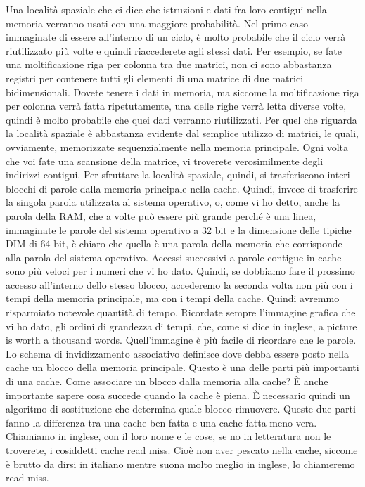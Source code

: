 Una località spaziale che ci dice che istruzioni e dati fra loro contigui nella memoria verranno usati con una maggiore probabilità.
Nel primo caso immaginate di essere all'interno di un ciclo, è molto probabile che il ciclo verrà riutilizzato più volte e quindi riaccederete agli stessi dati.
Per esempio, se fate una moltificazione riga per colonna tra due matrici, non ci sono abbastanza registri per contenere tutti gli elementi di una matrice di due matrici bidimensionali.
Dovete tenere i dati in memoria, ma siccome la moltificazione riga per colonna verrà fatta ripetutamente, una delle righe verrà letta diverse volte, quindi è molto probabile che quei dati verranno riutilizzati.
Per quel che riguarda la località spaziale è abbastanza evidente dal semplice utilizzo di matrici, le quali, ovviamente, memorizzate sequenzialmente nella memoria principale.
Ogni volta che voi fate una scansione della matrice, vi troverete verosimilmente degli indirizzi contigui.
Per sfruttare la località spaziale, quindi, si trasferiscono interi blocchi di parole dalla memoria principale nella cache.
Quindi, invece di trasferire la singola parola utilizzata al sistema operativo, o, come vi ho detto, anche la parola della RAM, che a volte può essere più grande perché è una linea, immaginate le parole del sistema operativo a 32 bit e la dimensione delle tipiche DIM di 64 bit, è chiaro che quella è una parola della memoria che corrisponde alla parola del sistema operativo.
Accessi successivi a parole contigue in cache sono più veloci per i numeri che vi ho dato.
Quindi, se dobbiamo fare il prossimo accesso all'interno dello stesso blocco, accederemo la seconda volta non più con i tempi della memoria principale, ma con i tempi della cache.
Quindi avremmo risparmiato notevole quantità di tempo.
Ricordate sempre l'immagine grafica che vi ho dato, gli ordini di grandezza di tempi, che, come si dice in inglese, a picture is worth a thousand words.
Quell'immagine è più facile di ricordare che le parole.
Lo schema di invidizzamento associativo definisce dove debba essere posto nella cache un blocco della memoria principale.
Questo è una delle parti più importanti di una cache.
Come associare un blocco dalla memoria alla cache?
È anche importante sapere cosa succede quando la cache è piena.
È necessario quindi un algoritmo di sostituzione che determina quale blocco rimuovere.
Queste due parti fanno la differenza tra una cache ben fatta e una cache fatta meno vera.
Chiamiamo in inglese, con il loro nome e le cose, se no in letteratura non le troverete, i cosiddetti cache read miss.
Cioè non aver pescato nella cache, siccome è brutto da dirsi in italiano mentre suona molto meglio in inglese, lo chiameremo read miss.
